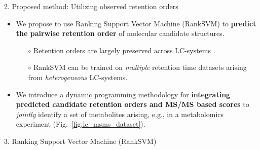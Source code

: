 \documentclass{beamer}
\begin{document}
\begin{frame}{}
\begin{columns}[T]
\begin{column}{.48\linewidth}
\begin{block}       {{\normalsize 2. Proposed method: Utilizing observed retention orders}}
\begin{itemize}
                    \setlength\itemsep{0.25em} 
                    \item We propose to use Ranking Support Vector Machine (RankSVM) \citep{Joachims2002} to \textbf{predict the pairwise retention order} of molecular candidate structures.
\begin{itemize}             
                    \vspace{-1.0cm}
                    \item[$\circ$] Retention orders are largely preserved across LC-systems \citep{Stanstrup2015}.
                    \item[$\circ$] RankSVM can be trained on \emph{multiple} retention time datasets arising from \emph{heterogeneous} LC-systems. 
\end{itemize}                    
                    \item We introduce a dynamic programming methodology for \textbf{integrating predicted candidate retention orders and MS/MS based scores} to \emph{jointly} identify a set of metabolites arising, e.g., in a metabolomics experiment (Fig.~\ref{fig:lc_msms_dataset}).
\end{itemize}     
\end{block}

\begin{block}       {{\normalsize 3. Ranking Support Vector Machine (RankSVM)}}
                    

\end{block}
\end{column}
\end{columns}
\end{frame}
\end{document}
